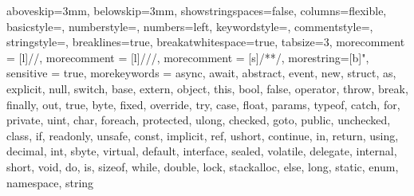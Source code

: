 
\usepackage[T1]{fontenc}
\usepackage[utf8]{inputenc}


\usepackage[hyphens]{url}
\usepackage[breaklinks,colorlinks=true,pdftex,pageanchor=false]{hyperref}

\usepackage[nooneline,bf]{caption} %
\usepackage{times}

\usepackage[dvips,pdftex]{graphicx}
\usepackage{epic}
\usepackage{eepic}
\usepackage{epsfig}
\usepackage{tikz}
\usepackage{pgfplots}
\usepackage{float} %
\usepackage{subcaption}
\usepackage{transparent}

\usepackage{multicol}
\usepackage{multirow}

\usepackage{rotating}
\usepackage{hhline}

\usepackage{listings}

 {
  aboveskip=3mm,
  belowskip=3mm,
  showstringspaces=false,
  columns=flexible,
  basicstyle={\footnotesize\ttfamily},
  numberstyle={\tiny},
  numbers=left,
  keywordstyle=\color{blue},
  commentstyle=\color{dkgreen},
  stringstyle=\color{mauve},
  breaklines=true,
  breakatwhitespace=true,
  tabsize=3,
  morecomment = [l]{//}, 
  morecomment = [l]{///},
  morecomment = [s]{/*}{*/},
  morestring=[b]", 
  sensitive = true,
  morekeywords = {async, await, abstract,  
    event,  new,  struct,
    as,  explicit,  null,  switch,
    base,  extern,  object,  this,
    bool,  false,  operator,  throw,
    break,  finally,  out,  true,
    byte,  fixed,  override,  try,
    case,  float,  params,  typeof,
    catch,  for,  private,  uint,
    char,  foreach,  protected,  ulong,
    checked,  goto,  public,  unchecked,
    class,  if,  readonly,  unsafe,
    const,  implicit,  ref,  ushort,
    continue,  in,  return,  using,
    decimal,  int,  sbyte,  virtual,
    default,  interface,  sealed,  volatile,
    delegate,  internal,  short,  void,
    do,  is,  sizeof,  while,
    double,  lock,  stackalloc,   
    else,  long,  static,   
    enum,  namespace,  string }
}
\lstset{style=csharp}

